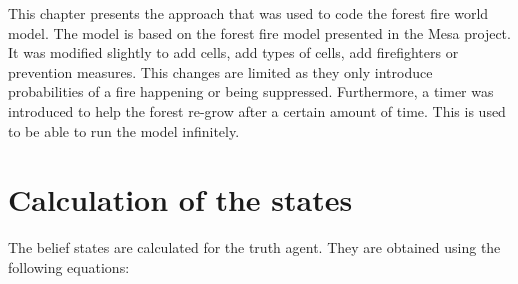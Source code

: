 This chapter presents the approach that was used to code the forest fire world model. The model is based on the forest fire model presented in the Mesa project. It was modified slightly to add cells, add types of cells, add firefighters or prevention measures. This changes are limited as they only introduce probabilities of a fire happening or being suppressed. Furthermore, a timer was introduced to help the forest re-grow after a certain amount of time. This is used to be able to run the model infinitely.

%
\section{Calculation of the states}

The belief states are calculated for the truth agent. They are obtained using the following equations:

